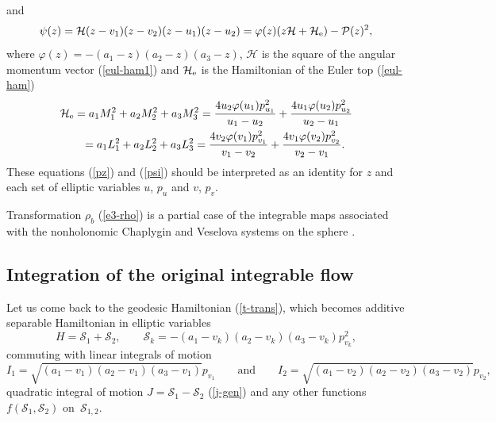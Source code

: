 \documentclass[pdftex]{sigma}
\numberwithin{equation}{section}
\begin{document}
and
\begin{equation} \label{psi}
\psi(z)=\mathcal H(z-v_1)(z-v_2)(z-u_1)(z-u_2)=\varphi(z)(z\mathcal H+\mathcal H_{\rm e})-\mathcal P(z)^2 ,
\end{equation}
where $ \varphi(z)=-(a_1-z)(a_2-z)(a_3-z)$, $\mathcal H$ is the square of the angular momentum vector (\ref{eul-ham1}) and $\mathcal H_{\rm e}$ is the Hamiltonian of the Euler top (\ref{eul-ham})
\begin{gather*}
\mathcal H_{\rm e}= a_1M_1^2+a_2M_2^2+a_3M_3^2=\dfrac{4u_2\varphi(u_1)p_{u_1}^2}{u_1 - u_2} +\dfrac{4u_1\varphi(u_2)p_{u_2}^2}{u_2-u_1}\\
\hphantom{\mathcal H_e}{}
= a_1L_1^2+a_2L_2^2+a_3L_3^2=\dfrac{4v_2\varphi(v_1)p_{v_1}^2}{v_1 - v_2} +\dfrac{4v_1\varphi(v_2)p_{v_2}^2}{v_2-v_1} .
\end{gather*}
These equations (\ref{pz}) and (\ref{psi}) should be interpreted as an identity for $z$ and each set of elliptic variables $u$, $p_u$ and $v$, $p_v$.

Transformation $\rho_b$ (\ref{e3-rho}) is a partial case of the integrable maps associated with the nonholonomic Chaplygin and Veselova systems on the sphere \cite{ts17v,ts17c}.

\subsection{Integration of the original integrable flow}
Let us come back to the geodesic Hamiltonian (\ref{t-trans}), which becomes additive separable Hamiltonian in elliptic variables
\begin{equation}\label{ham-sep-m}
H=\mathcal{S}_1+\mathcal{S}_2 ,\qquad\mathcal{S}_k=-(a_1-v_k)(a_2-v_k)(a_3-v_k)p_{v_k}^2 ,
\end{equation}
commuting with linear integrals of motion
\[
I_1=\sqrt{(a_1-v_1)(a_2-v_1)(a_3-v_1)} p_{v_1}\qquad\text{and}\qquad I_2=\sqrt{(a_1-v_2)(a_2-v_2)(a_3-v_2)} p_{v_2} ,
\]
quadratic integral of motion $J=\mathcal{S}_1-\mathcal{S}_2$ (\ref{j-gen}) and any other functions $f(\mathcal{S}_1,\mathcal{S}_2)$ on~$\mathcal{S}_{1,2}$.
\end{document}
